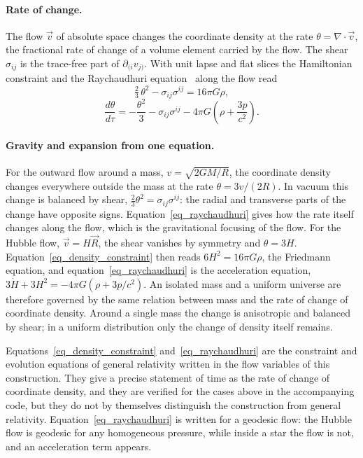 \documentclass[anonymous]{iopjournal}
\begin{document}
\paragraph{Rate of change.} The flow $\vec v$ of absolute space changes the coordinate density at the rate $\theta=\nabla\cdot\vec v$, the fractional rate of change of a volume element carried by the flow. The shear $\sigma_{ij}$ is the trace-free part of $\partial_{(i}v_{j)}$. With unit lapse and flat slices the Hamiltonian constraint and the Raychaudhuri equation~\cite{Raychaudhuri1955} along the flow read
\begin{equation}\label{eq_density_constraint}
    \tfrac23\,\theta^2-\sigma_{ij}\sigma^{ij}=16\pi G\rho ,
\end{equation}
\begin{equation}\label{eq_raychaudhuri}
    \frac{d\theta}{d\tau}=-\frac{\theta^2}{3}-\sigma_{ij}\sigma^{ij}-4\pi G\left(\rho+\frac{3p}{c^2}\right).
\end{equation}

\paragraph{Gravity and expansion from one equation.} For the outward flow around a mass, $v=\sqrt{2GM/R}$, the coordinate density changes everywhere outside the mass at the rate $\theta=3v/(2R)$. In vacuum this change is balanced by shear, $\tfrac23\theta^2=\sigma_{ij}\sigma^{ij}$: the radial and transverse parts of the change have opposite signs. Equation~\eqref{eq_raychaudhuri} gives how the rate itself changes along the flow, which is the gravitational focusing of the flow. For the Hubble flow, $\vec v=H\vec R$, the shear vanishes by symmetry and $\theta=3H$. Equation~\eqref{eq_density_constraint} then reads $6H^2=16\pi G\rho$, the Friedmann equation, and equation~\eqref{eq_raychaudhuri} is the acceleration equation, $3\dot H+3H^2=-4\pi G(\rho+3p/c^2)$. An isolated mass and a uniform universe are therefore governed by the same relation between mass and the rate of change of coordinate density. Around a single mass the change is anisotropic and balanced by shear; in a uniform distribution only the change of density itself remains.

Equations~\eqref{eq_density_constraint} and~\eqref{eq_raychaudhuri} are the constraint and evolution equations of general relativity written in the flow variables of this construction. They give a precise statement of time as the rate of change of coordinate density, and they are verified for the cases above in the accompanying code, but they do not by themselves distinguish the construction from general relativity. Equation~\eqref{eq_raychaudhuri} is written for a geodesic flow: the Hubble flow is geodesic for any homogeneous pressure, while inside a star the flow is not, and an acceleration term appears.
\end{document}
